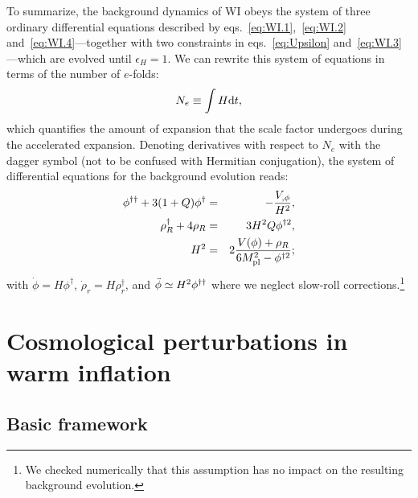 \documentclass[a4paper,11pt]{article}
\begin{document}
To summarize, the background dynamics of WI obeys the system of three ordinary differential
equations described by eqs.~\eqref{eq:WI.1},~\eqref{eq:WI.2} and~\eqref{eq:WI.4}—together with two constraints in eqs.~\eqref{eq:Upsilon} and~\eqref{eq:WI.3}—which are evolved until $\epsilon_H=1$. We can rewrite this system of equations in terms of the number of $e$-folds:
\begin{equation}
    N_e\equiv\int H {\rm d}t, \label{eq:defNe}
\end{equation}
which quantifies the amount of expansion that the scale factor undergoes during the accelerated expansion.
Denoting derivatives
with respect to $N_e$ with the dagger symbol (not to be confused with Hermitian conjugation), the system of differential equations for the background evolution reads:
\begin{eqnarray}
    \phi^{\dagger\dagger}+3(1+Q)\phi^{\dagger} &=& -\frac{V_{,\phi}}{H^2}, \label{eq:BG1}\\
    \rho_R^{\dagger}+4\rho_R &=& 3H^2Q\phi^{\dagger 2},  \label{eq:BG2}\\
    H^2 &=& 2\frac{V(\phi)+\rho_R}{6M_{\rm{pl}}^2-\phi^{\dagger 2}}; \label{eq:BG3}
\end{eqnarray}
with $\dot{\phi} = H\phi^{\dagger}$, $\dot{\rho}_r= H\rho_r^{\dagger}$, and $\Ddot{\phi} \simeq H^2\phi^{\dagger\dagger}$ where we neglect slow-roll corrections.\footnote{We checked numerically that this assumption has no impact on the resulting background evolution.}

\section{Cosmological perturbations in warm inflation}
\label{sec:perturbations}

\subsection{Basic framework \label{sec:perturbations_1}}
\end{document}
